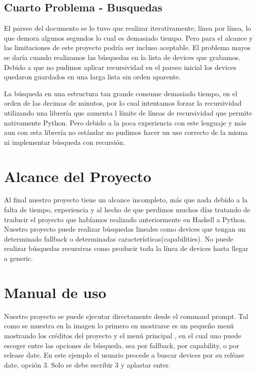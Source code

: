 \documentclass[11pt]{article} %
\begin{document}
\subsection{Cuarto Problema - Busquedas}

El parseo del documento se lo tuvo que realizar iterativamente, línea por línea, lo que demora algunos segundos lo cual es demasiado tiempo. Pero para el alcance y las limitaciones de este proyecto podría ser incluso aceptable. El problema mayos se daría cuando realizamos las búsquedas en la lista de devices que grabamos. Debido a que no pudimos aplicar recursividad en el parseo inicial los devices quedaron guardados en una larga lista sin orden aparente.

La búsqueda en una estructura tan grande consume demasiado tiempo, en el orden de las decimas de minutos, por lo cual intentamos forzar la recursividad utilizando una librería que aumenta l límite de líneas de recursividad que permite nativamente Python. Pero debido a la poca experiencia con este lenguaje y más aun con esta librería no estándar no pudimos hacer un uso correcto de la misma ni implementar búsqueda con recursión. 

\section{Alcance del Proyecto}


Al final nuestro proyecto tiene un alcance incompleto, más que nada debido a la falta de tiempo, experiencia y al hecho de que perdimos muchos días tratando de traducir el proyecto que habíamos realizado anteriormente en Haskell a Python. Nuestro proyecto puede realizar búsquedas lineales como devices que tengan un determinado fallback o determinadas características(capabilities). No puede realizar búsquedas recursivas como producir toda la línea de devices hasta llegar a generic. 


\section{Manual de uso}

Nuestro proyecto se puede ejecutar directamente desde el command prompt. Tal como se muestra en la imagen lo primero en mostrarse es un pequeño menú mostrando los créditos del proyecto y el menú principal , en el cual uno puede escoger entre las opciones de búsqueda, sea por fallback, por capability, o por release date. En este ejemplo el usuario procede a buscar devices por su reléase date, opción 3. Solo se debe escribir 3 y aplastar enter.
\end{document}
